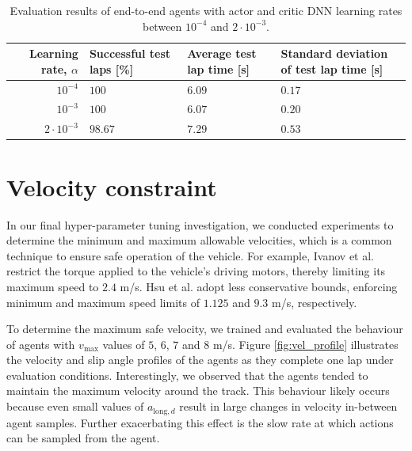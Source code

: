 \begin{table}[h]
\centering
\renewcommand{\arraystretch}{1.2}
\small
\begin{tabularx}{\textwidth}{RLLL} 
    \hline
    \textbf{Learning rate, $\alpha$} & \textbf{Successful test laps [\%]} & \textbf{Average test lap time [s]} & \textbf{Standard deviation of test lap time [s]}\\ 
    \hline
    $10^{-4}$       &   $100$       & $6.09$    & $0.17$      \\     
    $10^{-3}$       &   $100$        & $6.07$    & $0.20$     \\      
    $2\cdot10^{-3}$ &   $98.67$     & $7.29$    & $0.53$      \\
    \hline
\end{tabularx}
\caption[Evaluation results of end-to-end agents with varied learning rates]{Evaluation results of end-to-end agents with actor and critic DNN learning rates between $10^{-4}$ and  $2\cdot10^{-3}$.}
\label{tab:learning_rate}
\end{table}






\section{Velocity constraint} \label{sec:velocity_constraint}

In our final hyper-parameter tuning investigation, we conducted experiments to determine the minimum and maximum allowable velocities, which is a common technique to ensure safe operation of the vehicle.
For example, Ivanov et al. \cite{Ivanov2020} restrict the torque applied to the vehicle's driving motors, thereby limiting its maximum speed to $2.4$ m/s. 
Hsu et al. \cite{hsu2022} adopt less conservative bounds, enforcing minimum and maximum speed limits of $1.125$ and $9.3$ m/s, respectively.

To determine the maximum safe velocity, we trained and evaluated the behaviour of agents with $v_{\text{max}}$ values of $5$, $6$, $7$ and $8$ m/s.
Figure \ref{fig:vel_profile} illustrates the velocity and slip angle profiles of the agents as they complete one lap under evaluation conditions.
Interestingly, we observed that the agents tended to maintain the maximum velocity around the track.
This behaviour likely occurs because even small values of $a_{\text{long},d}$ result in large changes in velocity in-between agent samples.
Further exacerbating this effect is the slow rate at which actions can be sampled from the agent.

